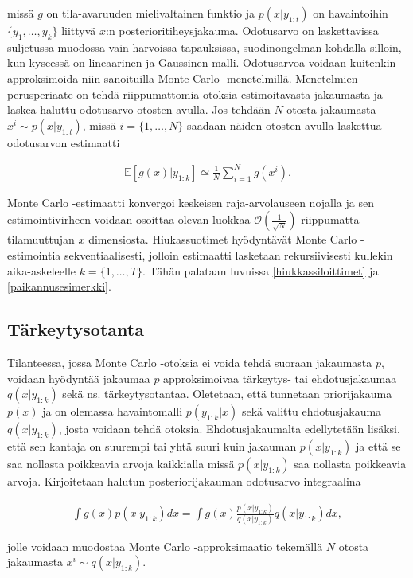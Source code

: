 \documentclass[
  12pt,
  a4paper, twoside]{book}
\begin{document}
\noindent missä \(g\) on tila-avaruuden mielivaltainen funktio ja \(p(x|y_{1:t})\) on havaintoihin \(\{y_1,\ldots,y_k\}\) liittyvä \(x\):n posterioritiheysjakauma. Odotusarvo on laskettavissa suljetussa muodossa vain harvoissa tapauksissa, suodinongelman kohdalla silloin, kun kyseessä on lineaarinen ja Gaussinen malli. Odotusarvoa voidaan kuitenkin approksimoida niin sanoituilla Monte Carlo -menetelmillä. Menetelmien perusperiaate on tehdä riippumattomia otoksia estimoitavasta jakaumasta ja laskea haluttu odotusarvo otosten avulla. Jos tehdään \(N\) otosta jakaumasta \(x^i\sim p(x|y_{1:t})\), missä \(i=\{1,\ldots,N\}\) saadaan näiden otosten avulla laskettua odotusarvon estimaatti

\begin{align}
\mathbb{E}[g(x)|y_{1:k}]\simeq\frac{1}{N}\sum_{i=1}^N g(x^i).
\end{align}

Monte Carlo -estimaatti konvergoi keskeisen raja-arvolauseen nojalla ja sen estimointivirheen voidaan osoittaa olevan luokkaa \(\mathcal{O}(\frac{1}{\sqrt{N}})\) riippumatta tilamuuttujan \(x\) dimensiosta. Hiukassuotimet hyödyntävät Monte Carlo -estimointia sekventiaalisesti, jolloin estimaatti lasketaan rekursiivisesti kullekin aika-askeleelle \(k=\{1,\ldots, T\}\). Tähän palataan luvuissa \ref{hiukkassiloittimet} ja \ref{paikannusesimerkki}.

\subsection{Tärkeytysotanta}

Tilanteessa, jossa Monte Carlo -otoksia ei voida tehdä suoraan jakaumasta \(p\), voidaan hyödyntää jakaumaa \(p\) approksimoivaa tärkeytys- tai ehdotusjakaumaa \(q(x|y_{1:k})\) sekä ns. tärkeytysotantaa. Oletetaan, että tunnetaan priorijakauma \(p(x)\) ja on olemassa havaintomalli \(p(y_{1:k}|x)\) sekä valittu ehdotusjakauma \(q(x|y_{1:k})\), josta voidaan tehdä otoksia. Ehdotusjakaumalta edellytetään lisäksi, että sen kantaja on suurempi tai yhtä suuri kuin jakauman \(p(x|y_{1:k})\) ja että se saa nollasta poikkeavia arvoja kaikkialla missä \(p(x|y_{1:k})\) saa nollasta poikkeavia arvoja. Kirjoitetaan halutun posteriorijakauman odotusarvo integraalina

\begin{align}
\int g(x)p(x|y_{1:k})dx=\int g(x)\frac{p(x|y_{1:k})}{q(x|y_{1:k})}q(x|y_{1:k})dx,
\end{align}

\noindent jolle voidaan muodostaa Monte Carlo -approksimaatio tekemällä \(N\) otosta jakaumasta \(x^i \sim q(x|y_{1:k})\).
\end{document}
